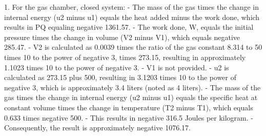 1. For the gas chamber, closed system:
   - The mass of the gas times the change in internal energy (u2 minus u1) equals the heat added minus the work done, which results in PQ equaling negative 1361.57.
   - The work done, W, equals the initial pressure times the change in volume (V2 minus V1), which equals negative 285.47.
   - V2 is calculated as 0.0039 times the ratio of the gas constant 8.314 to 50 times 10 to the power of negative 3, times 273.15, resulting in approximately 1.1023 times 10 to the power of negative 3.
   - V1 is not provided.
   - u2 is calculated as 273.15 plus 500, resulting in 3.1203 times 10 to the power of negative 3, which is approximately 3.4 liters (noted as 4 liters).
   - The mass of the gas times the change in internal energy (u2 minus u1) equals the specific heat at constant volume times the change in temperature (T2 minus T1), which equals 0.633 times negative 500.
   - This results in negative 316.5 Joules per kilogram.
   - Consequently, the result is approximately negative 1076.17.